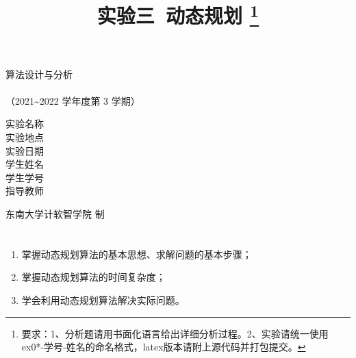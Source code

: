 \documentclass[12pt,a4paper]{ctexart}
\begin{document}
    \begin{titlepage}
        \heiti
        \vspace*{64pt}
        \begin{center}
            \fontsize{48pt}{0} 算法设计与分析\\
            \vspace*{36pt}
            \\
            \vspace*{48pt}
            \LARGE（2021\~{}2022 学年度\qquad 第 3 学期）\\
            \vspace*{48pt}
        
            \LARGE 实验名称\ \ \underline{\makebox[200pt]{\ExamTitle}}\\
            \LARGE 实验地点\ \ \underline{\makebox[200pt]{\ExamAddr}}\\
            \LARGE 实验日期\ \ \underline{\makebox[200pt]{\today}}\\
            \LARGE 学生姓名\ \ \underline{\makebox[200pt]{\MyName}}\\
            \LARGE 学生学号\ \ \underline{\makebox[200pt]{\MySID}}\\
            \LARGE 指导教师\ \ \underline{\makebox[200pt]{\TeacherName}}\\
            \vspace*{48pt}
            
            \LARGE 东南大学\quad  计软智学院 \quad 制
        \end{center}
    \end{titlepage}

\title{
  {\heiti \textbf{实验三\ 动态规划}
    \footnote{要求：1、分析题请用书面化语言给出详细分析过程。2、实验请统一使用ex0*-学号-姓名的命名格式，latex版本请附上源代码并打包提交。}
    }
}
\date{}

\maketitle

\section*{\bf \color{black}{一、实验目的及意义}}
\noindent
\begin{enumerate}
	\item[(1)]  掌握动态规划算法的基本思想、求解问题的基本步骤；
	\item[(2)]  掌握动态规划算法的时间复杂度；
	\item[(3)]  学会利用动态规划算法解决实际问题。
\end{enumerate}
\end{document}
